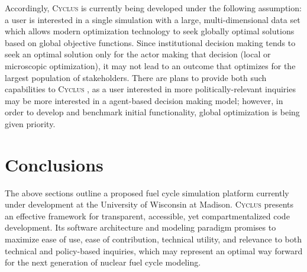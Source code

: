 \documentclass{anstrans}
\newcommand{\Cyclus}{\textsc{Cyclus }}
\begin{document}
Accordingly, \Cyclus is currently being developed under the following assumption: a user is interested in a single simulation with a large, multi-dimensional data set which allows modern optimization technology to seek globally optimal solutions based on global objective functions. Since institutional decision making tends to seek an optimal solution only for the actor making that decision (local or microscopic optimization), it may not lead to an outcome that optimizes for the largest population of stakeholders. There are plans to provide both such capabilities to \Cyclus, as a user interested in more politically-relevant inquiries may be more interested in a agent-based decision making model; however, in order to develop and benchmark initial functionality, global optimization is being given priority.

\section{Conclusions}
The above sections outline a proposed fuel cycle simulation platform currently under development at the University of Wisconsin at Madison. \Cyclus presents an effective framework for transparent, accessible, yet compartmentalized code development. Its software architecture and modeling paradigm promises to maximize ease of use, ease of contribution, technical utility, and relevance to both technical and policy-based inquiries, which may represent an optimal way forward for the next generation of nuclear fuel cycle modeling.



\nocite{huff_cyclus:_2010}
 

\end{document}
